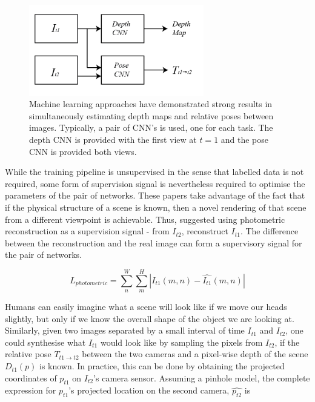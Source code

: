 \documentclass[openany]{book}
\begin{document}
\begin{figure}[htbp]
    \centering
    \includegraphics[width=3in]{images/cnns.png}
    \caption{Machine learning approaches have demonstrated strong results in simultaneously estimating depth maps and relative poses between images. Typically, a pair of CNN's is used, one for each task. The depth CNN is provided with the first view at $t=1$ and the pose CNN is provided both views.}
    \label{2cnns}
\end{figure}


While the training pipeline is unsupervised in the sense that labelled data is not required, some form of supervision signal is nevertheless required to optimise the parameters of the pair of networks. These papers take advantage of the fact that if the physical structure of a scene is known, then a novel rendering of that scene from a different viewpoint is achievable. Thus, \cite{garg2016unsupervised} suggested using photometric reconstruction as a supervision signal - from $I_{t2}$, reconstruct $I_{t1}$. The difference between the reconstruction and the real image can form a supervisory signal for the pair of networks. 


\begin{equation}
    L_{photometric} = \sum_n^W \sum_m^H |I_{t1}(m,n) - \hat{I_{t1}}(m,n)|
    \label{photometricloss}
\end{equation}


Humans can easily imagine what a scene will look like if we move our heads slightly, but only if we know the overall shape of the object we are looking at. Similarly, given two images separated by a small interval of time $I_{t1}$ and $I_{t2}$, one could synthesise what $I_{t1}$ would look like by sampling the pixels from $I_{t2}$, if the relative pose $T_{t1\rightarrow t2}$ between the two cameras and a pixel-wise depth of the scene $D_{t1}(p)$ is known. In practice, this can be done by obtaining the projected coordinates of $p_{t1}$ on $I_{t2}$'s camera sensor. Assuming a pinhole model, the complete expression for $p_{t1}$'s projected location on the second camera, $\hat{p_{t2}}$ is 
\end{document}
